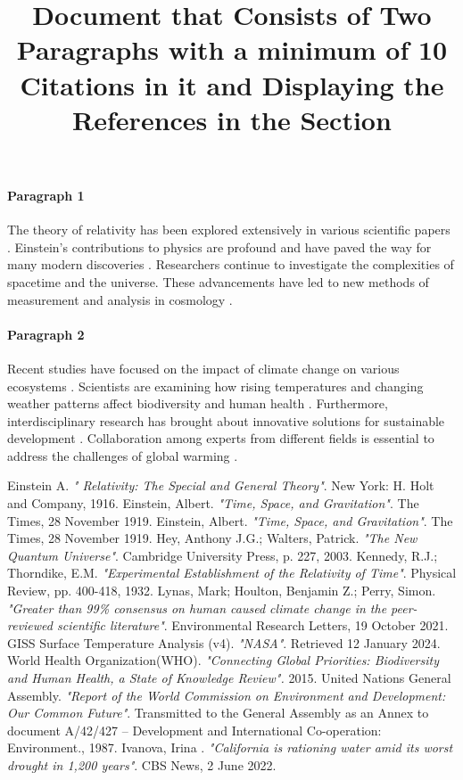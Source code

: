\documentclass{article}
\begin{document}
\title{Document that Consists of Two Paragraphs with a minimum of 10 Citations in it and Displaying the References in the Section}
\date{}
\maketitle
\paragraph{Paragraph 1}
The theory of relativity has been explored extensively in various scientific papers \citep{author1, author2}. Einstein's contributions to physics are profound and have paved the way for many modern discoveries \citep{author3}. Researchers continue to investigate the complexities of spacetime and the universe\citep{author4}. These advancements have led to new methods of measurement and analysis in cosmology \citep{author5}.
\paragraph{Paragraph 2}
Recent studies have focused on the impact of climate change on various ecosystems \citep{author6, author7}. Scientists are examining how rising temperatures and changing weather patterns affect biodiversity and human health \citep{author8}. Furthermore, interdisciplinary research has brought about innovative solutions for sustainable development \citep{author9}. Collaboration among experts from different fields is essential to address the challenges of global warming \citep{author10}.
\newpage 
\begin{thebibliography}{99}
     Einstein A. \textit{" Relativity: The Special and General Theory"}. New York: H. Holt and Company, 1916.
     Einstein, Albert. \textit{"Time, Space, and Gravitation"}. The Times, 28 November 1919.
      Einstein, Albert. \textit{"Time, Space, and Gravitation"}. The Times, 28 November 1919.
     Hey, Anthony J.G.; Walters, Patrick. \textit{"The New Quantum Universe"}. Cambridge University Press, p. 227, 2003.
     Kennedy, R.J.; Thorndike, E.M. \textit{"Experimental Establishment of the Relativity of Time"}. Physical Review, pp. 400-418, 1932.
     Lynas, Mark; Houlton, Benjamin Z.; Perry, Simon. \textit{"Greater than 99\% consensus on human caused climate change in the peer-reviewed scientific literature"}. Environmental Research Letters, 19 October 2021.
     GISS Surface Temperature Analysis (v4). \textit{"NASA"}. Retrieved 12 January 2024.
      World Health Organization(WHO). \textit{"Connecting Global Priorities: Biodiversity and Human Health, a State of Knowledge Review".} 2015.
     United Nations General Assembly. \textit{"Report of the World Commission on Environment and Development: Our Common Future"}. Transmitted to the General Assembly as an Annex to document A/42/427 – Development and International Co-operation: Environment., 1987.
     Ivanova, Irina . \textit{"California is rationing water amid its worst drought in 1,200 years"}. CBS News, 2 June 2022.
\end{thebibliography}
\end{document}

